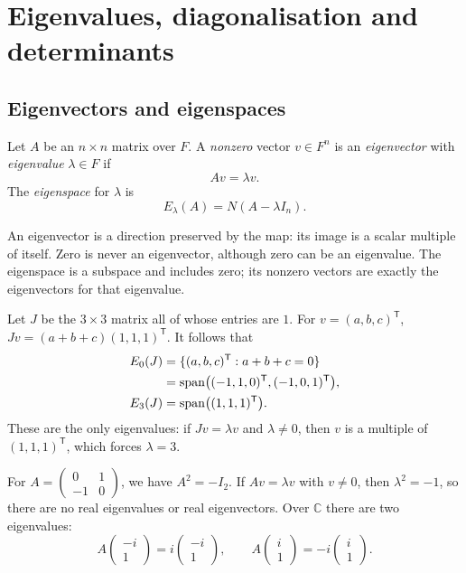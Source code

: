\chapter{Eigenvalues, diagonalisation and determinants}
\label{chap:algebra-eigenvalues}

\section{Eigenvectors and eigenspaces}

\begin{definition}
Let $A$ be an $n\times n$ matrix over $F$.
A \emph{nonzero} vector $v\in F^n$ is an \emph{eigenvector} with
\emph{eigenvalue} $\lambda\in F$ if
\[
 Av=\lambda v.
\]
The \emph{eigenspace} for $\lambda$ is
\[
 E_\lambda(A)=N(A-\lambda I_n).
\]
\end{definition}

An eigenvector is a direction preserved by the map: its image is a
scalar multiple of itself. Zero is never an eigenvector, although zero
can be an eigenvalue.
The eigenspace is a subspace and includes zero; its nonzero vectors are
exactly the eigenvectors for that eigenvalue.

\begin{example}
Let $J$ be the $3\times3$ matrix all of whose entries are $1$.
For $v=(a,b,c)^{\mathsf T}$,
$Jv=(a+b+c)(1,1,1)^{\mathsf T}$.
It follows that
\begin{align*}
 E_0(J)&=\{(a,b,c)^{\mathsf T}:a+b+c=0\}\\
 &=\operatorname{span}\bigl((-1,1,0)^{\mathsf T},(-1,0,1)^{\mathsf T}\bigr),\\
 E_3(J)&=\operatorname{span}\bigl((1,1,1)^{\mathsf T}\bigr).
\end{align*}
These are the only eigenvalues: if $Jv=\lambda v$ and $\lambda\ne0$,
then $v$ is a multiple of $(1,1,1)^{\mathsf T}$, which forces $\lambda=3$.
\end{example}

\begin{example}
For $A=\begin{pmatrix}0&1\\-1&0\end{pmatrix}$, we have $A^2=-I_2$.
If $Av=\lambda v$ with $v\ne0$, then $\lambda^2=-1$, so there are
no real eigenvalues or real eigenvectors.
Over $\mathbb C$ there are two eigenvalues:
\[
 A\begin{pmatrix}-i\\1\end{pmatrix}
 =i\begin{pmatrix}-i\\1\end{pmatrix},\qquad
 A\begin{pmatrix}i\\1\end{pmatrix}
 =-i\begin{pmatrix}i\\1\end{pmatrix}.
\]
\end{example}

